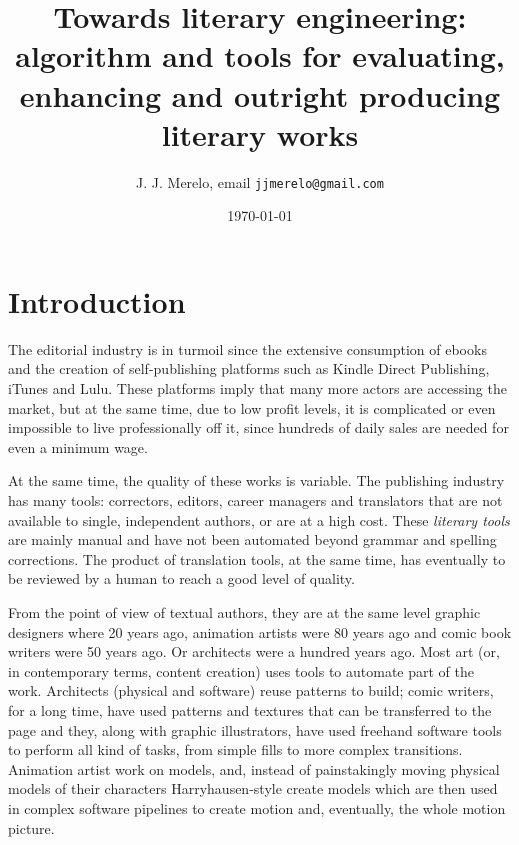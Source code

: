 \documentclass[a4paper,12pt,twocolumn]{article}
\title{Towards literary engineering: algorithm and tools for
  evaluating, enhancing and outright producing literary works}
\author{J. J. Merelo, email {\tt jjmerelo@gmail.com}}
\date{\today}
\begin{document}
\section{Introduction}

The editorial industry is in turmoil since the extensive consumption
of ebooks and the creation of self-publishing platforms such as Kindle
Direct Publishing, iTunes and Lulu. These platforms imply that many more actors are accessing the market, but at the same time, due to low profit levels, it is complicated or even impossible to live professionally off it, since hundreds of daily sales are needed for even a minimum wage.

At the same time, the quality of these works is variable. The
publishing industry has many tools: correctors, editors, career
managers and translators that are not available to single, independent
authors, or are at a high cost. These {\em literary tools} are mainly manual and have not been
automated beyond grammar and spelling corrections. The product of translation tools,
at the same time, has eventually to be reviewed by a human to reach a
good level of quality.

From the point of view of textual authors, they are at the same level
graphic designers where 20 years ago, animation artists were 80 years ago and comic book writers were 50
years ago. Or architects were a hundred years ago. Most art (or, in
contemporary terms, content creation) uses tools to automate part of
the work. Architects (physical and software) reuse patterns to build;
comic writers, for a long time, have used patterns and textures that
can be transferred to the page and they, along with graphic
illustrators, have used freehand software tools to perform all kind of
tasks, from simple fills to more complex transitions. Animation artist
work on models, and, instead of painstakingly moving physical models
of their characters  Harryhausen-style create models which are then
used in complex software pipelines to create motion and, eventually,
the whole motion picture.
\end{document}

